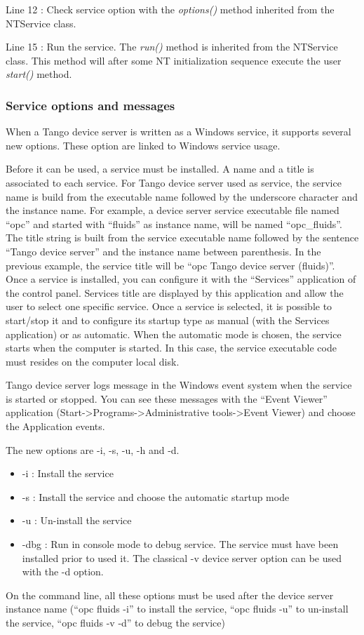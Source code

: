 Line 12 : Check service option with the \emph{options()} method inherited
from the NTService class.

Line 15 : Run the service. The \emph{run()} method is inherited from
the NTService class. This method will after some NT initialization
sequence execute the user \emph{start()} method.

\subsubsection{Service options and messages}

When a Tango device server is written as a Windows service, it supports
several new options. These option are linked to Windows service
usage.

Before it can be used, a service must be installed. A name and a title
is associated to each service. For Tango device server used as service,
the service name is build from the executable name followed by the
underscore character and the instance name. For example, a device
server service executable file named ``opc'' and started with ``fluids''
as instance name, will be named ``opc\_fluids''. The title string
is built from the service executable name followed by the sentence
``Tango device server'' and the instance name between parenthesis.
In the previous example, the service title will be ``opc Tango device
server (fluids)''. Once a service is installed, you can configure
it with the ``Services'' application of the control panel. Services
title are displayed by this application and allow the user to select
one specific service. Once a service is selected, it is possible to
start/stop it and to configure its startup type as manual (with the
Services application) or as automatic. When the automatic mode is
chosen, the service starts when the computer is started. In this case,
the service executable code must resides on the computer local disk.

Tango device server logs message in the Windows event
system when the service is started or stopped. You can see these messages
with the ``Event Viewer'' application (Start->Programs->Administrative
tools->Event Viewer) and choose the Application events.

The new options are -i, -s, -u, -h and -d.
\begin{itemize}
\item -i : Install the service
\item -s : Install the service and choose the automatic startup mode
\item -u : Un-install the service
\item -dbg : Run in console mode to debug service. The service must have
been installed prior to used it. The classical -v device server option
can be used with the -d option.
\end{itemize}
On the command line, all these options must be used after the device
server instance name (``opc fluids -i'' to install the service,
``opc fluids -u'' to un-install the service, ``opc fluids -v -d''
to debug the service)

